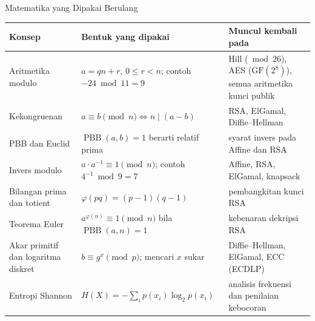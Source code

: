 \documentclass[aspectratio=169,11pt]{beamer}
\begin{document}
\begin{frame}{Matematika yang Dipakai Berulang}
    \scriptsize
    \begin{tabularx}{\linewidth}{@{}>{\raggedright\arraybackslash}p{3.0cm} >{\raggedright\arraybackslash}p{4.5cm} >{\raggedright\arraybackslash}X@{}}
        \toprule
        \textbf{Konsep} & \textbf{Bentuk yang dipakai} & \textbf{Muncul kembali pada} \\
        \midrule
        Aritmetika modulo & $a = qn + r$, $0 \le r < n$; contoh $-24 \bmod 11 = 9$ & Hill ($\bmod 26$), AES ($\mathrm{GF}(2^8)$), semua aritmetika kunci publik \\
        \addlinespace[1pt]
        Kekongruenan & $a \equiv b \pmod n \iff n \mid (a-b)$ & RSA, ElGamal, Diffie--Hellman \\
        \addlinespace[1pt]
        PBB dan Euclid & $\operatorname{PBB}(a,b)=1$ berarti relatif prima & syarat invers pada Affine dan RSA \\
        \addlinespace[1pt]
        Invers modulo & $a \cdot a^{-1} \equiv 1 \pmod n$; contoh $4^{-1} \bmod 9 = 7$ & Affine, RSA, ElGamal, knapsack \\
        \addlinespace[1pt]
        Bilangan prima dan totient & $\varphi(pq)=(p-1)(q-1)$ & pembangkitan kunci RSA \\
        \addlinespace[1pt]
        Teorema Euler & $a^{\varphi(n)} \equiv 1 \pmod n$ bila $\operatorname{PBB}(a,n)=1$ & kebenaran dekripsi RSA \\
        \addlinespace[1pt]
        Akar primitif dan logaritma diskret & $b \equiv g^{x} \pmod p$; mencari $x$ sukar & Diffie--Hellman, ElGamal, ECC (ECDLP) \\
        \addlinespace[1pt]
        Entropi Shannon & $H(X)=-\sum_i p(x_i)\log_2 p(x_i)$ & analisis frekuensi dan penilaian kebocoran \\
        \bottomrule
    \end{tabularx}
\end{frame}
\end{document}
